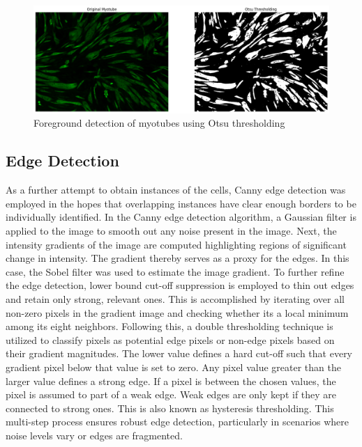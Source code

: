 \begin{figure}
	\centering
	\includegraphics[width=\textwidth]{"images/otsu_tube.png"}
	\caption[Otsu thresholding applied to myotubes]{Foreground detection of myotubes using Otsu thresholding}
	\label{figotsutube}
\end{figure}
\newpage
\subsection{Edge Detection}
As a further attempt to obtain instances of the cells, Canny edge detection \cite{canny} was employed in the hopes that overlapping instances have clear enough borders to be individually identified. In the Canny edge detection algorithm, a Gaussian filter is applied to the image to smooth out any noise present in the image. Next, the intensity gradients of the image are computed highlighting regions of significant change in intensity. The gradient thereby serves as a proxy for the edges. In this case, the Sobel filter \cite{Gonzalez1992} was used to estimate the image gradient. To further refine the edge detection, lower bound cut-off suppression is employed to thin out edges and retain only strong, relevant ones. This is accomplished by iterating over all non-zero pixels in the gradient image and checking whether its a local minimum among its eight neighbors. Following this, a double thresholding technique is utilized to classify pixels as potential edge pixels or non-edge pixels based on their gradient magnitudes. The lower value defines a hard cut-off such that every gradient pixel below that value is set to zero. Any pixel value greater than the larger value defines a strong edge. If a pixel is between the chosen values, the pixel is assumed to part of a weak edge. Weak edges are only kept if they are connected to strong ones. This is also known as hysteresis thresholding. This multi-step process ensures robust edge detection, particularly in scenarios where noise levels vary or edges are fragmented.
